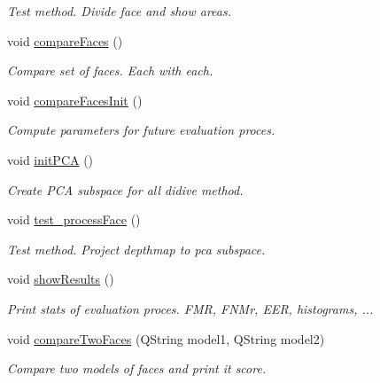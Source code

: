 \begin{DoxyCompactItemize}
\begin{DoxyCompactList}\small\item\em Test method. Divide face and show areas. \end{DoxyCompactList}\item 
\hypertarget{class_run_a778d1344efc30498528df386ba9f57ad}{void \hyperlink{class_run_a778d1344efc30498528df386ba9f57ad}{compare\+Faces} ()}\label{class_run_a778d1344efc30498528df386ba9f57ad}

\begin{DoxyCompactList}\small\item\em Compare set of faces. Each with each. \end{DoxyCompactList}\item 
\hypertarget{class_run_a9507971299fd133f73330b75c23a1466}{void \hyperlink{class_run_a9507971299fd133f73330b75c23a1466}{compare\+Faces\+Init} ()}\label{class_run_a9507971299fd133f73330b75c23a1466}

\begin{DoxyCompactList}\small\item\em Compute parameters for future evaluation proces. \end{DoxyCompactList}\item 
\hypertarget{class_run_aa3cf45f2a01021fd7b48f57f922a09b9}{void \hyperlink{class_run_aa3cf45f2a01021fd7b48f57f922a09b9}{init\+P\+C\+A} ()}\label{class_run_aa3cf45f2a01021fd7b48f57f922a09b9}

\begin{DoxyCompactList}\small\item\em Create P\+C\+A subspace for all didive method. \end{DoxyCompactList}\item 
\hypertarget{class_run_aa001f85413ff26cdb5fab5fc0122d151}{void \hyperlink{class_run_aa001f85413ff26cdb5fab5fc0122d151}{test\+\_\+process\+Face} ()}\label{class_run_aa001f85413ff26cdb5fab5fc0122d151}

\begin{DoxyCompactList}\small\item\em Test method. Project depthmap to pca subspace. \end{DoxyCompactList}\item 
\hypertarget{class_run_a93e59f66034bce13861cb3e631064de6}{void \hyperlink{class_run_a93e59f66034bce13861cb3e631064de6}{show\+Results} ()}\label{class_run_a93e59f66034bce13861cb3e631064de6}

\begin{DoxyCompactList}\small\item\em Print stats of evaluation proces. F\+M\+R, F\+N\+Mr, E\+E\+R, histograms, ... \end{DoxyCompactList}\item 
void \hyperlink{class_run_ab334d76369153e702120aad6cbdedc99}{compare\+Two\+Faces} (Q\+String model1, Q\+String model2)
\begin{DoxyCompactList}\small\item\em Compare two models of faces and print it score. \end{DoxyCompactList}\end{DoxyCompactItemize}
